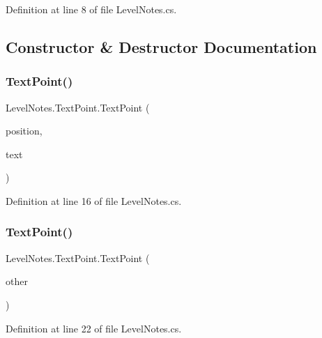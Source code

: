 Definition at line 8 of file Level\+Notes.\+cs.



\subsection{Constructor \& Destructor Documentation}
\mbox{\label{class_level_notes_1_1_text_point_a9cc1f1fd4109a45c444c9817f3c6331d}} 
\subsubsection{\texorpdfstring{Text\+Point()}{TextPoint()}\hspace{0.1cm}{\footnotesize\ttfamily [1/2]}}
{\footnotesize\ttfamily Level\+Notes.\+Text\+Point.\+Text\+Point (\begin{DoxyParamCaption}\item[{Vector3}]{position,  }\item[{string}]{text }\end{DoxyParamCaption})}



Definition at line 16 of file Level\+Notes.\+cs.

\mbox{\label{class_level_notes_1_1_text_point_a539fca9ff9c038549c93ac9f804c3da4}} 
\subsubsection{\texorpdfstring{Text\+Point()}{TextPoint()}\hspace{0.1cm}{\footnotesize\ttfamily [2/2]}}
{\footnotesize\ttfamily Level\+Notes.\+Text\+Point.\+Text\+Point (\begin{DoxyParamCaption}\item[{\mbox{\hyperlink{class_level_notes_1_1_text_point}{Text\+Point}}}]{other }\end{DoxyParamCaption})}



Definition at line 22 of file Level\+Notes.\+cs.



